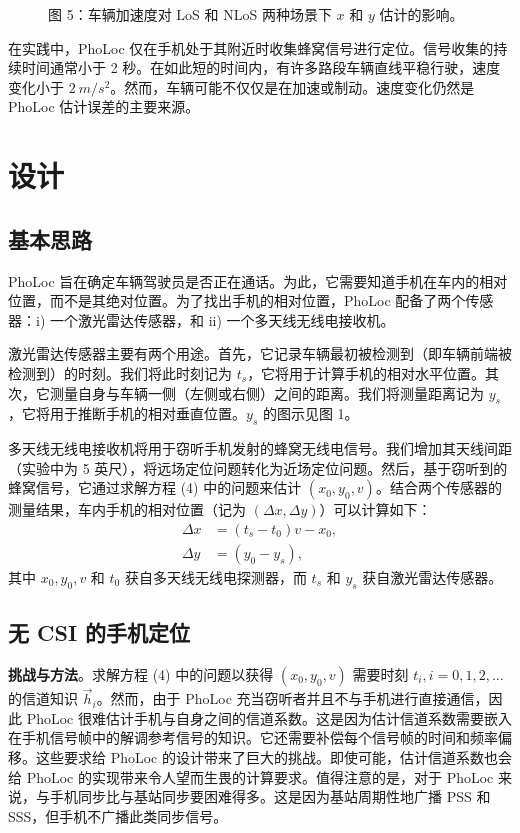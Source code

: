 \documentclass[journal, onecolumn]{IEEEtran}
\begin{document}
\begin{figure}[htbp]
\centering
\caption{图 5：车辆加速度对 LoS 和 NLoS 两种场景下 $x$ 和 $y$ 估计的影响。}
\label{fig:5}
\end{figure}

在实践中，PhoLoc 仅在手机处于其附近时收集蜂窝信号进行定位。信号收集的持续时间通常小于 2 秒。在如此短的时间内，有许多路段车辆直线平稳行驶，速度变化小于 $2~m/s^{2}$。然而，车辆可能不仅仅是在加速或制动。速度变化仍然是 PhoLoc 估计误差的主要来源。

\section{设计}

\subsection{基本思路}
PhoLoc 旨在确定车辆驾驶员是否正在通话。为此，它需要知道手机在车内的相对位置，而不是其绝对位置。为了找出手机的相对位置，PhoLoc 配备了两个传感器：i) 一个激光雷达传感器，和 ii) 一个多天线无线电接收机。

激光雷达传感器主要有两个用途。首先，它记录车辆最初被检测到（即车辆前端被检测到）的时刻。我们将此时刻记为 $t_{s}$，它将用于计算手机的相对水平位置。其次，它测量自身与车辆一侧（左侧或右侧）之间的距离。我们将测量距离记为 $y_{s}$，它将用于推断手机的相对垂直位置。$y_{s}$ 的图示见图 1。

多天线无线电接收机将用于窃听手机发射的蜂窝无线电信号。我们增加其天线间距（实验中为 5 英尺），将远场定位问题转化为近场定位问题。然后，基于窃听到的蜂窝信号，它通过求解方程 (4) 中的问题来估计 $(x_{0},y_{0},v)$。结合两个传感器的测量结果，车内手机的相对位置（记为 $(\Delta x,\Delta y)$）可以计算如下：
\begin{subequations}
\begin{align}
\Delta x &= (t_{s}-t_{0})v-x_{0}, \\
\Delta y &= (y_{0}-y_{s}),
\end{align}
\end{subequations}
其中 $x_{0}, y_{0}, v$ 和 $t_{0}$ 获自多天线无线电探测器，而 $t_{s}$ 和 $y_{s}$ 获自激光雷达传感器。

\subsection{无 CSI 的手机定位}
\textbf{挑战与方法}。求解方程 (4) 中的问题以获得 $(x_{0},y_{0},v)$ 需要时刻 $t_{i}, i=0,1,2,\dots$ 的信道知识 $\vec{h}_{i}$。然而，由于 PhoLoc 充当窃听者并且不与手机进行直接通信，因此 PhoLoc 很难估计手机与自身之间的信道系数。这是因为估计信道系数需要嵌入在手机信号帧中的解调参考信号的知识。它还需要补偿每个信号帧的时间和频率偏移。这些要求给 PhoLoc 的设计带来了巨大的挑战。即使可能，估计信道系数也会给 PhoLoc 的实现带来令人望而生畏的计算要求。值得注意的是，对于 PhoLoc 来说，与手机同步比与基站同步要困难得多。这是因为基站周期性地广播 PSS 和 SSS，但手机不广播此类同步信号。
\end{document}
